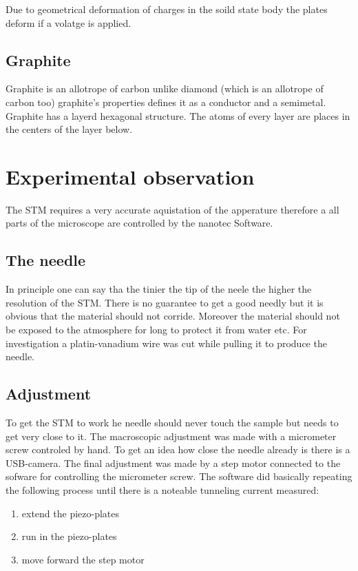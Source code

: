 \documentclass[a4paper, parskip=half]{scrartcl}
\begin{document}
Due to geometrical deformation of charges in the soild state body the plates deform if a volatge is applied.

\subsection{Graphite}
Graphite is an allotrope of carbon unlike diamond (which is an allotrope of carbon too) graphite's properties defines it as a conductor and a semimetal. Graphite has a layerd hexagonal structure. The atoms of every layer are places in the centers of the layer below.


\section{Experimental observation}
The STM requires a very accurate aquistation of the apperature therefore a all parts of the microscope are controlled by the nanotec\cite{nanotec} Software.

\subsection{The needle}
In principle one can say tha the tinier the tip of the neele the higher the resolution of the STM. There is no guarantee to get a good needly but it is obvious that the material should not corride. Moreover the material should not be exposed to the atmosphere for long to protect it from water etc. For investigation a platin-vanadium wire was cut while pulling it to produce the needle.
 
\subsection{Adjustment}
To get the STM to work he needle should never touch the sample but needs to get very close to it. The macroscopic adjustment was made with a micrometer screw controled by hand. To get an idea how close the needle already is there is a USB-camera. The final adjustment was made by a step motor connected to the sofware for controlling the  micrometer screw. The software did basically repeating the following process until there is a noteable tunneling current measured:
\begin{enumerate}
\item extend the piezo-plates
\item run in the piezo-plates
\item move forward the step motor
\end{enumerate}
\end{document}
